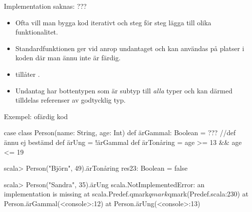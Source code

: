 



\begin{Slide}{Implementation saknas: ???}
\begin{itemize}
\item Ofta vill man bygga kod iterativt och steg för steg lägga till olika funktionalitet.

\item Standardfunktionen  ger vid anrop undantaget  och kan användas på platser i koden där man ännu inte är färdig.

\item {} tillåter .

\pause

\item Undantag har bottentypen  som är subtyp till \emph{alla} typer och kan därmed tilldelas referenser av godtycklig typ.


\end{itemize}
\end{Slide}

\begin{Slide}{Exempel: ofärdig kod}
\begin{Code}[basicstyle=\SlideFontSize{9}{11}\ttfamily\selectfont]
case class Person(name: String, age: Int){
  def ärGammal: Boolean = ???   //def ännu ej bestämd
  def ärUng = !ärGammal
  def ärTonåring = age >= 13 && age <= 19
}
\end{Code}
\begin{REPLnonum}
scala> Person("Björn", 49).ärTonåring
res23: Boolean = false

scala> Person("Sandra", 35).ärUng
scala.NotImplementedError: an implementation is missing
  at scala.Predef$.$qmark$qmark$qmark(Predef.scala:230)
  at Person.ärGammal(<console>:12)
  at Person.ärUng(<console>:13)
\end{REPLnonum}
\end{Slide}


